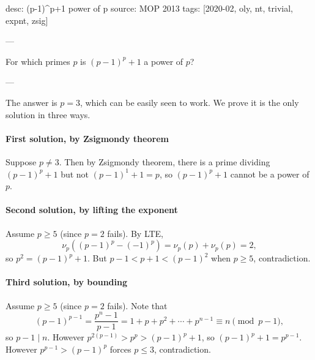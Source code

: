 desc: (p-1)^p+1 power of p
source: MOP 2013
tags: [2020-02, oly, nt, trivial, expnt, zsig]

---

For which primes $p$ is $(p-1)^p+1$ a power of $p$?

---

The answer is $p=3$, which can be easily seen to work. We prove it is the only solution in three ways.

\paragraph{First solution, by Zsigmondy theorem}     Suppose $p\ne3$. Then by Zsigmondy theorem, there is a prime dividing $(p-1)^p+1$ but not $(p-1)^1+1=p$, so $(p-1)^p+1$ cannot be a power of $p$.

\paragraph{Second solution, by lifting the exponent}     Assume $p\ge5$ (since $p=2$ fails). By LTE, \[\nu_p\left( (p-1)^p-(-1)^p\right)=\nu_p(p)+\nu_p(p)=2,\]
so $p^2=(p-1)^p+1$. But $p-1<p+1<(p-1)^2$ when $p\ge5$, contradiction.

\paragraph{Third solution, by bounding}     Assume $p\ge5$ (since $p=2$ fails). Note that \[(p-1)^{p-1}=\frac{p^n-1}{p-1}=1+p+p^2+\cdots+p^{n-1}\equiv n\pmod{p-1},\]
so $p-1\mid n$. However $p^{2(p-1)}>p^p>(p-1)^p+1$, so $(p-1)^p+1=p^{p-1}$. However $p^{p-1}>(p-1)^p$ forces $p\le3$, contradiction.

